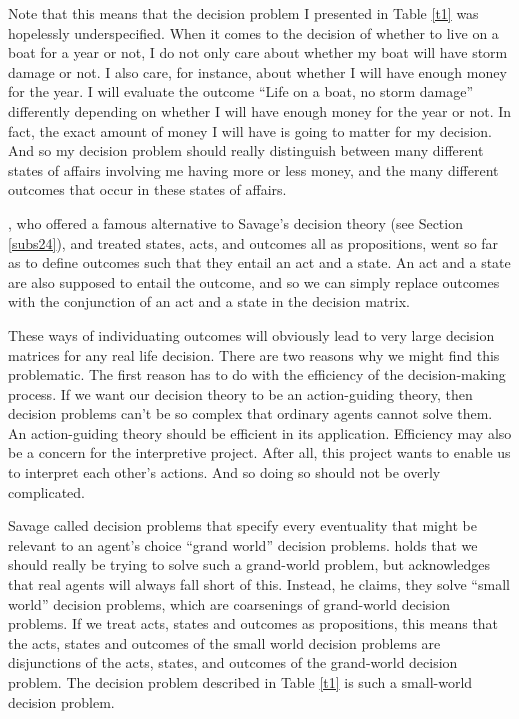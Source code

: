 Note that this means that the decision problem I presented in Table \ref{t1} was hopelessly underspecified. When it comes to the decision of whether to live on a boat for a year or not, I do not only care about whether my boat will have storm damage or not. I also care, for instance, about whether I will have enough money for the year. I will evaluate the outcome ``Life on a boat, no storm damage'' differently depending on whether I will have enough money for the year or not. In fact, the exact amount of money I will have is going to matter for my decision. And so my decision problem should really distinguish between many different states of affairs involving me having more or less money, and the many different outcomes that occur in these states of affairs.

\citet{Jeffrey1983}, who offered a famous alternative to Savage's decision theory (see Section \ref{subs24}), and treated states, acts, and outcomes all as propositions, went so far as to define outcomes such that they entail an act and a state. An act and a state are also supposed to entail the outcome, and so we can simply replace outcomes with the conjunction of an act and a state in the decision matrix.

These ways of individuating outcomes will obviously lead to very large decision matrices for any real life decision. There are two reasons why we might find this problematic. The first reason has to do with the efficiency of the decision-making process. If we want our decision theory to be an action-guiding theory, then decision problems can't be so complex that ordinary agents cannot solve them. An action-guiding theory should be efficient in its application. Efficiency may also be a concern for the interpretive project. After all, this project wants to enable us to interpret each other's actions. And so doing so should not be overly complicated.

Savage called decision problems that specify every eventuality that might be relevant to an agent's choice ``grand world'' decision problems. \citet{Joyce1999} holds that we should really be trying to solve such a grand-world problem, but acknowledges that real agents will always fall short of this. Instead, he claims, they solve ``small world'' decision problems, which are coarsenings of grand-world decision problems. If we treat acts, states and outcomes as propositions, this means that the acts, states and outcomes of the small world decision problems are disjunctions of the acts, states, and outcomes of the grand-world decision problem. The decision problem described in Table \ref{t1} is such a small-world decision problem.

